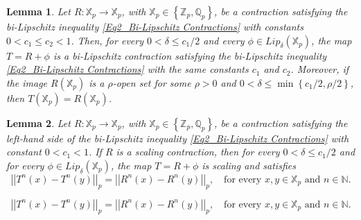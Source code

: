 \documentclass[10pt,a4paper]{amsart}
\newtheorem{lemma}{Lemma}
\begin{document}
	\begin{lemma}\label{Lem2_Open bi-Lipschitz Contraction plus Lipschitz}
		Let $R: \mathbb{X}_{p} \to \mathbb{X}_{p}$, with $\mathbb{X}_{p} \in  \left\{  \mathbb{Z}_{p}, \mathbb{Q}_{p}  \right\} $, be a contraction satisfying the bi-Lipschitz inequality \eqref{Eq2_Bi-Lipschitz Contractions} with constants $0  < c_{1} \le c_{2}  < 1$. 
		Then, for every $0  < \delta \le  c_{1}/2  $ and every $\phi \in Lip_{\delta} \left(  \mathbb{X}_{p}  \right) $, the map $T = R + \phi$ is a bi-Lipschitz contraction satisfying the bi-Lipschitz inequality \eqref{Eq2_Bi-Lipschitz Contractions} with the same constants $c_{1}$ and $c_{2}$. 
		Moreover, if the image $R \left(  \mathbb{X}_{p}  \right) $ is a $\rho$-open set for some $\rho  > 0$ and $0  < \delta \le \min \left\{  c_{1}/2,   \rho/2  \right\} $, then $ T \left(  \mathbb{X}_{p}  \right)  = R \left(  \mathbb{X}_{p}  \right) $.
	\end{lemma}

	\begin{lemma}\label{Lem2_Scaling Contraction plus Lipschitz}
		Let $R: \mathbb{X}_{p} \to \mathbb{X}_{p}$, with $\mathbb{X}_{p} \in  \left\{  \mathbb{Z}_{p}, \mathbb{Q}_{p}  \right\} $, be a contraction satisfying the left-hand side of the bi-Lipschitz inequality \eqref{Eq2_Bi-Lipschitz Contractions} with constant $0  < c_{1}   < 1$. 
		If $R$ is a scaling contraction, then for every $0  < \delta \le  c_{1}/2  $ and for every $\phi \in Lip_{\delta} \left(  \mathbb{X}_{p}  \right) $, the map $T = R + \phi$ is scaling and satisfies 
		\begin{equation}\label{EqLem_Scaling Maps Induction}
			\left| \left|  T^{n}(x) - T^{n}(y)  \right|  \right|_{p}   =    \left| \left|  R^{n}(x) - R^{n}(y)  \right|  \right|_{p}, \quad \text{for every } x,y \in \mathbb{X}_{p} \text{ and } n \in \mathbb{N} . 
		\end{equation} 
		
	\end{lemma}

		\begin{equation}
			\left| \left|  T^{n}(x) - T^{n}(y)  \right|  \right|_{p}   =    \left| \left|  R^{n}(x) - R^{n}(y)  \right|  \right|_{p}, \quad \text{for every } x,y \in \mathbb{X}_{p} \text{ and } n \in \mathbb{N} . 
		\end{equation} 
\end{document}
